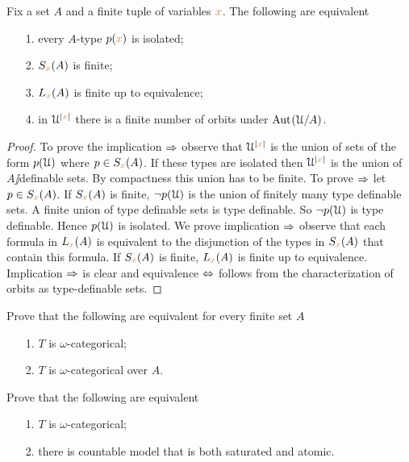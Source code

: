 \documentclass[creche.tex]{subfiles}
\begin{document}
\begin{proposition}\label{prop_ERNS_equivalents}
Fix a set $A$ and a finite tuple of variables ${\color{brown} x}$.
The following are equivalent\nobreak
\begin{itemize}   
\item[1.] every $A$-type $p({\color{brown} x})$ is isolated;
\item[2.] $S_{\color{brown} x}(A)$ is finite;
\item[3.] $L_{\color{brown} x}(A)$ is finite up to equivalence;
\item[4.] in $\EuScript U^{|{\color{brown} x}|}$ there is a finite number of orbits under $\textrm{Aut\kern.15ex}(\EuScript U/A)$.
\end{itemize}
\end{proposition}
\begin{proof}To prove the implication $\Rightarrow$ observe that $\EuScript U^{|{\color{brown} x}|}$ is the union of sets of the form $p(\EuScript U)$ where $p\in S_{\color{brown} x}(A)$.
If these types are isolated then $\EuScript U^{|{\color{brown} x}|}$ is the union of $A\jj$definable sets.
By compactness this union has to be finite.
To prove $\Rightarrow$ let $p\in S_{\color{brown} x}(A)$.
If $S_{\color{brown} x}(A)$ is finite, $\neg p(\EuScript U)$ is the union of finitely many type definable sets.
A finite union of type definable sets is type definable.
So $\neg p(\EuScript U)$ is type definable.
Hence $p(\EuScript U)$ is isolated.
We prove implication $\Rightarrow$ observe that each formula in $L_{\color{brown} x}(A)$ is equivalent to the disjunction of the types in $S_{\color{brown} x}(A)$ that contain this formula.
If $S_{\color{brown} x}(A)$ is finite, $L_{\color{brown} x}(A)$ is finite up to equivalence.
Implication $\Rightarrow$ is clear and equivalence $\Leftrightarrow$ follows from the characterization of orbits as type-definable sets.
\end{proof}



\begin{exercise}\label{ex_omega_cat_overA}
Prove that the following are equivalent for every finite set $A$
\begin{itemize}   
\item[1.] $T$ is $\omega$-categorical;
\item[2.] $T$ is $\omega$-categorical over $A$.\QED
\end{itemize}
\end{exercise}

\begin{exercise}\label{ex_omega_cat_sat=atomic}
Prove that the following are equivalent
\begin{itemize}   
\item[1.] $T$ is $\omega$-categorical;
\item[2.] there is countable model that is both saturated and atomic.\QED 
\end{itemize}
\end{exercise}
\end{document}

